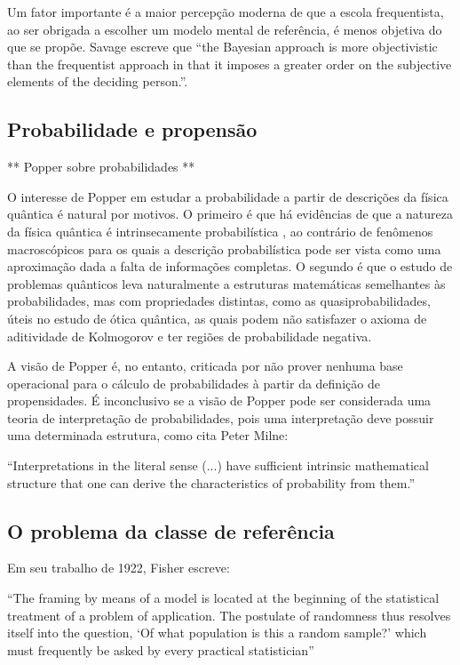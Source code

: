 Um fator importante é a maior percepção moderna
de que a escola frequentista, ao ser obrigada a escolher um modelo mental de referência, é menos objetiva do que se propõe.
Savage escreve que ``the Bayesian approach is more objectivistic than the frequentist approach in that it imposes a greater
order on the subjective elements of the deciding person.''\cite{Savage60}.	

\subsection{Probabilidade e propensão}

	** Popper sobre probabilidades **

O interesse de Popper em estudar a probabilidade a partir de descrições da física quântica é natural por motivos. O primeiro
é que há evidências de que a natureza da física quântica é intrinsecamente probabilística \cite{???}, ao contrário de fenômenos
macroscópicos para os quais a descrição probabilística pode ser vista como uma aproximação dada a falta de informações completas.
O segundo é que o estudo de problemas quânticos leva naturalmente a estruturas matemáticas semelhantes às probabilidades, mas
com	propriedades distintas, como as quasiprobabilidades, úteis no estudo de ótica quântica, as quais podem não satisfazer o
axioma de aditividade de Kolmogorov e ter regiões de probabilidade negativa\cite{Mandel95}.

A visão de Popper é, no entanto, criticada por não prover nenhuma base operacional para o cálculo de probabilidades à partir
da definição de propensidades. É inconclusivo se a visão de Popper pode ser considerada uma teoria de interpretação
de probabilidades, pois uma interpretação deve possuir uma determinada estrutura, como cita Peter Milne:

``Interpretations in the literal sense (...) have sufficient intrinsic mathematical structure that one can derive
the characteristics of probability from them.''\cite{Milne93}

\subsection{O problema da classe de referência}\label{sec:classref}

Em seu trabalho de 1922, Fisher escreve:

``The framing by means of a model is located at the beginning of the
statistical treatment of a problem of application. The postulate of randomness thus resolves itself into the 
question, `Of what population is this a random sample?' which must frequently be asked by every practical
statistician''\cite{Fisher1922}

